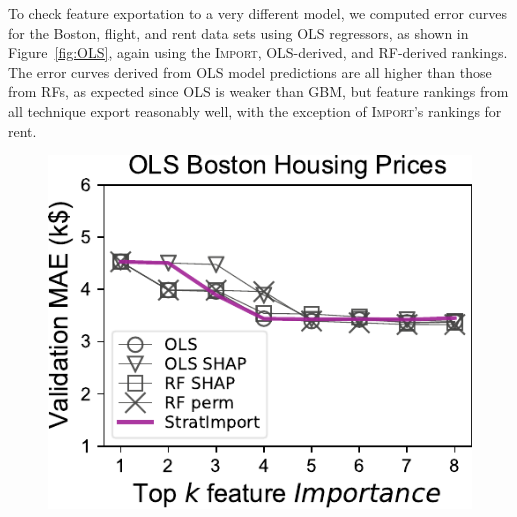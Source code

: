 \documentclass[11pt]{article}
\newcommand{\figref}[1]{Figure~\ref{#1}}
\newcommand{\Impo}{\fontfamily{cmr}\textsc{Import}}
\begin{document}
To check feature exportation to a very different model, we computed error curves for the Boston, flight, and rent data sets using OLS regressors, as shown in \figref{fig:OLS}, again using the \Impo{}, OLS-derived, and RF-derived rankings.  The error curves derived from OLS model predictions are all higher than those from RFs, as expected since OLS is weaker than GBM, but feature rankings from all technique export reasonably well, with the exception of \Impo's rankings for rent. 

\begin{figure}[htbp]
\begin{center}
\includegraphics[scale=0.5]{images/boston-topk-OLS-Importance.pdf}~~~

\end{center}
\end{figure}
\end{document}
